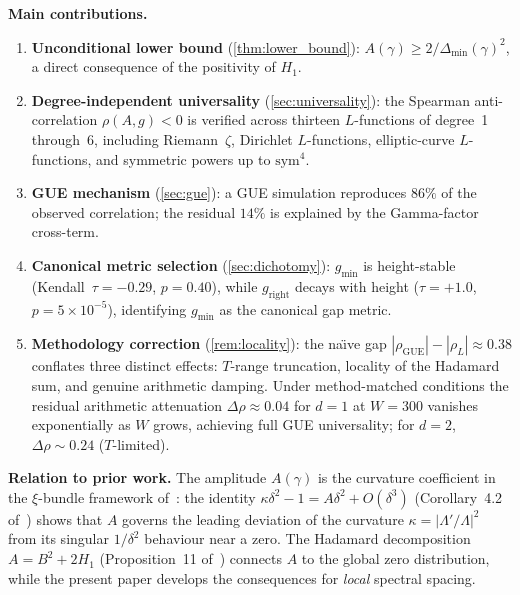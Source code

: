\documentclass[11pt,a4paper]{article}
\theoremstyle{plain}
\theoremstyle{definition}
\DeclareMathOperator{\GUE}{GUE}
\newcommand{\La}{\Lambda}
\begin{document}
\medskip\noindent\textbf{Main contributions.}
\begin{enumerate}[label=(\roman*)]
  \item \textbf{Unconditional lower bound} (\cref{thm:lower_bound}):
        $A(\gamma) \ge 2/\Delta_{\min}(\gamma)^2$, a direct consequence of
        the positivity of $H_1$.
  \item \textbf{Degree-independent universality}
        (\cref{sec:universality}): the Spearman anti-correlation
        $\rho(A, g) < 0$ is verified across thirteen $L$-functions of
        degree~1 through~6, including Riemann~$\zeta$, Dirichlet
        $L$-functions, elliptic-curve $L$-functions, and symmetric
        powers up to $\mathrm{sym}^4$.
  \item \textbf{GUE mechanism} (\cref{sec:gue}): a GUE simulation
        reproduces $86\%$ of the observed correlation; the residual
        $14\%$ is explained by the Gamma-factor cross-term.
  \item \textbf{Canonical metric selection}
        (\cref{sec:dichotomy}): $g_{\min}$ is
        height-stable (Kendall~$\tau = -0.29$, $p = 0.40$), while
        $g_{\mathrm{right}}$ decays with height ($\tau = +1.0$,
        $p = 5 \times 10^{-5}$), identifying $g_{\min}$ as the
        canonical gap metric.
  \item \textbf{Methodology correction}
        (\cref{rem:locality}): the na\"{\i}ve gap
        $|\rho_{\GUE}| - |\rho_L| \approx 0.38$ conflates three
        distinct effects: $T$-range truncation, locality of the
        Hadamard sum, and genuine arithmetic damping.  Under
        method-matched conditions the residual arithmetic
        attenuation $\Delta\rho \approx 0.04$ for $d = 1$ at
        $W\!=\!300$ vanishes exponentially as $W$ grows, achieving
        full GUE universality; for $d = 2$,
        $\Delta\rho \sim\!0.24$ ($T$-limited).
\end{enumerate}

\medskip\noindent\textbf{Relation to prior work.}
The amplitude $A(\gamma)$ is the curvature coefficient in the
$\xi$-bundle framework of~\cite{paper1,paper2,paper3}: the identity
$\kappa \delta^2 - 1 = A\delta^2 + O(\delta^3)$ (Corollary~4.2
of~\cite{paper2}) shows that $A$ governs the leading deviation of
the curvature $\kappa = |\La'/\La|^2$ from its singular
$1/\delta^2$ behaviour near a zero.  The Hadamard decomposition
$A = B^2 + 2H_1$ (Proposition~11 of~\cite{paper2}) connects $A$
to the global zero distribution, while the present paper develops
the consequences for \emph{local} spectral spacing.
\end{document}
